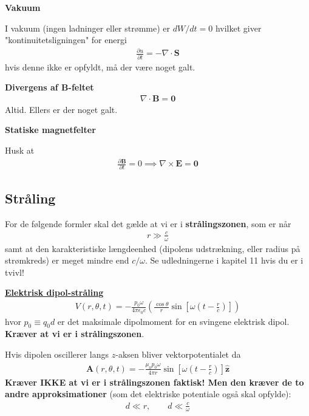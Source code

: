 \documentclass[a4paper]{article}
\begin{document}
    \textbf{Vakuum} 

    I vakuum (ingen ladninger eller strømme) er \(dW / dt = 0\) hvilket giver "kontinuitetsligningen" for energi \begin{align*}
        \frac{\partial u}{\partial t} = - \nabla \cdot \mathbf{S} \tag{8.12}
    \end{align*} 
    hvis denne ikke er opfyldt, må der være noget galt.
    
    \textbf{Divergens af \(\mathbf{B}\)-feltet }
    \begin{align*}
        \nabla \cdot \mathbf{B} = \mathbf{0}
    \end{align*} 
    Altid. Ellers er der noget galt.

    \textbf{Statiske magnetfelter}
    
    Husk at \begin{align*}
        \frac{\partial \mathbf{B}}{\partial t} = 0 \implies \nabla \times \mathbf{E} = \mathbf{0}
    \end{align*} 


    \subsection{Stråling}
    For de følgende formler skal det gælde at vi er i \textbf{strålingszonen}, som er når
    \begin{align*}
    r \gg \frac{c}{\omega} \tag{11.13}
    \end{align*}
    samt at den karakteristiske længdeenhed (dipolens udstrækning, eller radius på strømkreds) er meget mindre end \(c / \omega \). Se udledningerne i kapitel 11 hvis du er i tvivl! 
    
    \underline{\textbf{Elektrisk dipol-stråling}}
    \begin{align*}
        V(r, \theta , t) = - \frac{p_0 \omega }{4 \pi  \epsilon _0 c} \left( \frac{\cos \theta }{r} \sin \left[ \omega (t - \frac{r}{c}) \right]  \right)  \tag{11.14}
    \end{align*}
    hvor \(p_0 \equiv q_0 d\) er det maksimale dipolmoment for en svingene elektrisk dipol. \textbf{Kræver at vi er i strålingszonen}.
    
    Hvis dipolen oscillerer langs \(z\)-aksen bliver vektorpotentialet da 
    \begin{align*}
        \mathbf{A}(r, \theta, t) = - \frac{\mu _0 p_0 \omega }{4 \pi  r} \sin \left[ \omega (t - \frac{r}{c}) \right] \hat{\mathbf{z}} \tag{11.17}
    \end{align*}
    \textbf{Kræver IKKE at vi er i strålingszonen faktisk! Men den kræver de to andre approksimationer} (som det elektriske potentiale også skal opfylde): \begin{align*}
        d\ll r, \qquad d \ll \frac{c}{\omega } \tag{11.7+10}
    \end{align*} 
\end{document}
